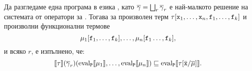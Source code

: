 \begin{proposition}
  \label{pr:op-name-inclusion2}
  Да разгледаме една програма  в езика \FUN, като
  $\overline{\gamma} = \bigsqcup_r\overline{\gamma}_r$ е най-малкото решение на системата от оператори за .
  Тогава за произволен терм $\tau[\texttt{x}_1,\dots,\texttt{x}_n,\texttt{f}_1,\dots,\texttt{f}_k]$ и
  произволни функционални термове
  \[\mu_1[\texttt{f}_1,\dots,\texttt{f}_k],\dots,\mu_n[\texttt{f}_1\dots,\texttt{f}_k],\]
  и всяко $r$, е изпълнено, че:
  \[\llbracket{\tau}\rrbracket(\overline{\gamma}_r)(\text{eval}_{\texttt{P}}\llbracket{{\mu_1}}\rrbracket,\dots,\text{eval}_{\texttt{P}}\llbracket{{\mu_n}}\rrbracket) \sqsubseteq \text{eval}_{\texttt{P}}\llbracket{{\tau[\bar{\texttt{x}}/\overline{\mu}]}}\rrbracket.\]
\end{proposition}
